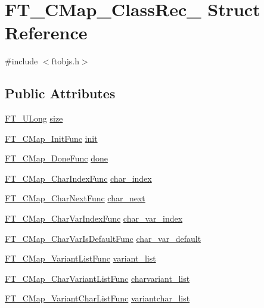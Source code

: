 \hypertarget{struct_f_t___c_map___class_rec__}{\section{F\-T\-\_\-\-C\-Map\-\_\-\-Class\-Rec\-\_\- Struct Reference}
\label{struct_f_t___c_map___class_rec__}
}


{\ttfamily \#include $<$ftobjs.\-h$>$}

\subsection*{Public Attributes}
\begin{DoxyCompactItemize}
\item 
\hyperlink{fttypes_8h_a4fac88bdba78eb76b505efa6e4fbf3f5}{F\-T\-\_\-\-U\-Long} \hyperlink{struct_f_t___c_map___class_rec___a86283cf239b9c0e559c9acbaa004def6}{size}
\item 
\hyperlink{ftobjs_8h_a1226ad1fe1c0f3d3d1bbfe421da5b176}{F\-T\-\_\-\-C\-Map\-\_\-\-Init\-Func} \hyperlink{struct_f_t___c_map___class_rec___afe1da0877ec0686dfe7b2e020fc0d408}{init}
\item 
\hyperlink{ftobjs_8h_a6e832d89ec73d5737854ff156fa33573}{F\-T\-\_\-\-C\-Map\-\_\-\-Done\-Func} \hyperlink{struct_f_t___c_map___class_rec___a00d1d77a4d926340b4d97bc03cd29231}{done}
\item 
\hyperlink{ftobjs_8h_a811e26a75d8b978bfd25c57bb2c28b34}{F\-T\-\_\-\-C\-Map\-\_\-\-Char\-Index\-Func} \hyperlink{struct_f_t___c_map___class_rec___ad1c0448188e8d52f6159b5521bb2dc83}{char\-\_\-index}
\item 
\hyperlink{ftobjs_8h_ab25e8fff7d1f8291c634a4ea8a18ad36}{F\-T\-\_\-\-C\-Map\-\_\-\-Char\-Next\-Func} \hyperlink{struct_f_t___c_map___class_rec___a053362f31fcfbc6a284cc8d026ab57ff}{char\-\_\-next}
\item 
\hyperlink{ftobjs_8h_a60713c476637eb6f853e64633f24f4be}{F\-T\-\_\-\-C\-Map\-\_\-\-Char\-Var\-Index\-Func} \hyperlink{struct_f_t___c_map___class_rec___a6bc46e2595aec30295e6d2bfc362afcb}{char\-\_\-var\-\_\-index}
\item 
\hyperlink{ftobjs_8h_a9f73594b560087e015c20feee44eb944}{F\-T\-\_\-\-C\-Map\-\_\-\-Char\-Var\-Is\-Default\-Func} \hyperlink{struct_f_t___c_map___class_rec___ac8305cb0aebd02b54c0046765f28ef4a}{char\-\_\-var\-\_\-default}
\item 
\hyperlink{ftobjs_8h_aa434508e1fd9e8816f4da72179d9e1b9}{F\-T\-\_\-\-C\-Map\-\_\-\-Variant\-List\-Func} \hyperlink{struct_f_t___c_map___class_rec___ad61635444cbfc71c4259e74cb892c172}{variant\-\_\-list}
\item 
\hyperlink{ftobjs_8h_aa128e727e9002b65343f9cac11e90f6a}{F\-T\-\_\-\-C\-Map\-\_\-\-Char\-Variant\-List\-Func} \hyperlink{struct_f_t___c_map___class_rec___a65db9dfa0e29b7de257dc8870532ab19}{charvariant\-\_\-list}
\item 
\hyperlink{ftobjs_8h_a227d6ffc043198cc277c64da2f4a64f2}{F\-T\-\_\-\-C\-Map\-\_\-\-Variant\-Char\-List\-Func} \hyperlink{struct_f_t___c_map___class_rec___ac1563590a0bac99082aa0996b94aad57}{variantchar\-\_\-list}
\end{DoxyCompactItemize}


